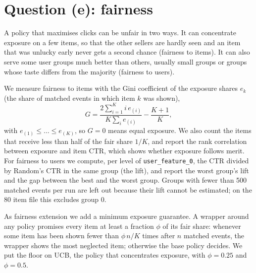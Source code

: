 \documentclass[11pt]{article}
\begin{document}
\section{Question (e): fairness}
\label{sec:e}

A policy that maximises clicks can be unfair in two ways. It can concentrate
exposure on a few items, so that the other sellers are hardly seen and an item
that was unlucky early never gets a second chance (fairness to items). It can
also serve some user groups much better than others, usually small groups or
groups whose taste differs from the majority (fairness to users).

We measure fairness to items with the Gini coefficient of the exposure shares
$e_k$ (the share of matched events in which item $k$ was shown),
%
\begin{equation}
  G = \frac{2\sum_{i=1}^{K} i\, e_{(i)}}{K\sum_{i} e_{(i)}} - \frac{K+1}{K},
  \label{eq:gini}
\end{equation}
%
with $e_{(1)}\leq\dots\leq e_{(K)}$, so $G=0$ means equal exposure. We also
count the items that receive less than half of the fair share $1/K$, and
report the rank correlation between exposure and item CTR, which shows
whether exposure follows merit. For fairness to users we compute, per level
of \texttt{user\_feature\_0}, the CTR divided by Random's CTR in the same
group (the lift), and report the worst group's lift and the gap between the
best and the worst group. Groups with fewer than 500 matched events per run
are left out because their lift cannot be estimated; on the 80 item file this
excludes group 0.

As fairness extension we add a minimum exposure guarantee. A wrapper around
any policy promises every item at least a fraction $\phi$ of its fair share:
whenever some item has been shown fewer than $\phi\, n/K$ times after $n$
matched events, the wrapper shows the most neglected item; otherwise the base
policy decides. We put the floor on UCB, the policy that concentrates
exposure, with $\phi = 0.25$ and $\phi = 0.5$.
\end{document}
